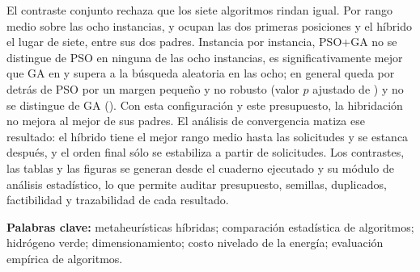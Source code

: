 El contraste conjunto rechaza que los siete algoritmos rindan igual. Por rango medio sobre las ocho instancias, \BestMeanRankAlgorithm{} y \SecondMeanRankAlgorithm{} ocupan las dos primeras posiciones y el híbrido el lugar \ControlRankPosition{} de siete, entre sus dos padres. Instancia por instancia, PSO+GA no se distingue de PSO en ninguna de las ocho instancias, es significativamente mejor que GA en \CtrlGaPlus{} y supera a la búsqueda aleatoria en las ocho; en general queda por detrás de PSO por un margen pequeño y no robusto (valor $p$ ajustado de \CtrlPsoWilcoxonHolm) y no se distingue de GA (\CtrlGaWilcoxonHolm). Con esta configuración y este presupuesto, la hibridación no mejora al mejor de sus padres. El análisis de convergencia matiza ese resultado: el híbrido tiene el mejor rango medio hasta las \ConvControlLeadTo{} solicitudes y se estanca después, y el orden final sólo se estabiliza a partir de \ConvSettleFrom{} solicitudes. Los contrastes, las tablas y las figuras se generan desde el cuaderno ejecutado y su módulo de análisis estadístico, lo que permite auditar presupuesto, semillas, duplicados, factibilidad y trazabilidad de cada resultado.

\vspace{1em}
\noindent\textbf{Palabras clave:} metaheurísticas híbridas; comparación estadística de algoritmos; hidrógeno verde; dimensionamiento; costo nivelado de la energía; evaluación empírica de algoritmos.

